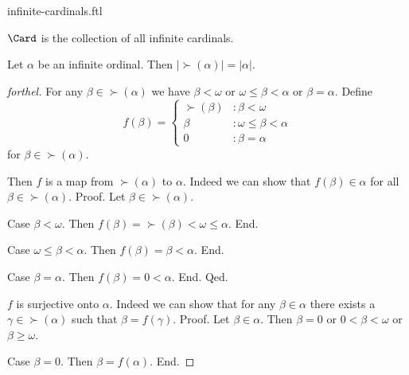\documentclass{naproche-library}
\begin{document}
\begin{smodule}[title=Infinite Cardinal Numbers]{infinite-cardinals.ftl}

\begin{definition}[forthel,id=SET_THEORY_07_4231078585827328]
  $\Card$ is the collection of all infinite cardinals.
\end{definition}

\begin{proposition}[forthel,id=SET_THEORY_07_8189062544359424]
  Let $\alpha$ be an infinite ordinal.
  Then $|\succ(\alpha)| = |\alpha|$.
\end{proposition}
\begin{proof}[forthel]
  For any $\beta \in \succ(\alpha)$ we have
  $\beta < \omega$ or $\omega \leq \beta < \alpha$ or $\beta = \alpha$.
  Define \[ f(\beta) =
    \begin{cases}
      \succ(\beta)  & : \beta < \omega
      \\
      \beta         & : \omega \leq \beta < \alpha
      \\
      0             & : \beta = \alpha
    \end{cases} \]
  for $\beta \in \succ(\alpha)$.

  Then $f$ is a map from $\succ(\alpha)$ to $\alpha$.
  Indeed we can show that $f(\beta) \in \alpha$ for all
  $\beta \in \succ(\alpha)$. \newline
  Proof.
    Let $\beta \in \succ(\alpha)$.

    Case $\beta < \omega$.
      Then $f(\beta)
        = \succ(\beta)
        < \omega
        \leq \alpha$.
    End.

    Case $\omega \leq \beta < \alpha$.
      Then $f(\beta)
        = \beta
        < \alpha$.
    End.

    Case $\beta = \alpha$.
      Then $f(\beta)
        = 0
        < \alpha$.
    End.
  Qed.

  $f$ is surjective onto $\alpha$.
  Indeed we can show that for any $\beta \in \alpha$ there exists a
  $\gamma \in \succ(\alpha)$ such that $\beta = f(\gamma)$. \newline
  Proof.
    Let $\beta \in \alpha$.
    Then $\beta = 0$ or $0 < \beta < \omega$ or $\beta \geq \omega$.

    Case $\beta = 0$.
      Then $\beta = f(\alpha)$.
    End.


\end{proof}
\end{smodule}
\end{document}
